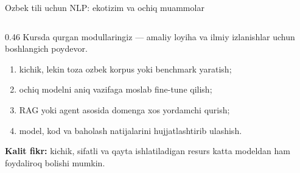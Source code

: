 \documentclass[aspectratio=169,11pt]{beamer}
\newcommand{\uzq}{\textquotesingle{}}   %
\begin{document}
\begin{frame}{O\uzq{}zbek tili uchun NLP: ekotizim va ochiq muammolar}
\begin{columns}[T,totalwidth=\textwidth]
\begin{column}{0.46\textwidth}
      Kursda qurgan modullaringiz --- amaliy loyiha va ilmiy izlanishlar
      uchun boshlang\uzq{}ich poydevor.

      \vspace{-4pt}

      \begin{tcolorbox}[okbox,title={Amaliy yo\uzq{}nalishlar},top=2pt,bottom=2pt,boxsep=0.1mm]
        \footnotesize
        \begin{enumerate}\setlength\itemsep{2pt}
          \item kichik, lekin toza o\uzq{}zbek korpus yoki benchmark yaratish;
          \item ochiq modelni aniq vazifaga moslab fine-tune qilish;
          \item RAG yoki agent asosida domenga xos yordamchi qurish;
          \item model, kod va baholash natijalarini hujjatlashtirib ulashish.
        \end{enumerate}
      \end{tcolorbox}

      \vspace{-4pt}

      \begin{tcolorbox}[defbox,top=2pt,bottom=2pt,boxsep=0.1mm]
        \footnotesize
        \textbf{Kalit fikr:}
        kichik, sifatli va qayta ishlatiladigan resurs katta modeldan ham
        foydaliroq bo\uzq{}lishi mumkin.
      \end{tcolorbox}
    \end{column}
  \end{columns}
\end{frame}
\end{document}
